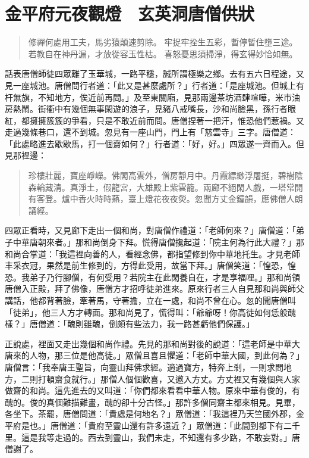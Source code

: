
\chapter{金平府元夜觀燈　玄英洞唐僧供狀}

\begin{quote}
修禪何處用工夫，馬劣猿顛速剪除。
牢捉牢拴生五彩，暫停暫住墮三途。
若教自在神丹漏，才放從容玉性枯。
喜怒憂思須掃淨，得玄得妙恰如無。
\end{quote}

話表唐僧師徒四眾離了玉華城，一路平穩，誠所謂極樂之鄉。去有五六日程途，又見一座城池。唐僧問行者道：「此又是甚麼處所？」行者道：「是座城池。但城上有杆無旗，不知地方，俟近前再問。」及至東關廂，見那兩邊茶坊酒肆喧嘩，米市油房熱鬧。街衢中有幾個無事閑遊的浪子，見豬八戒嘴長，沙和尚臉黑，孫行者眼紅，都擁擁簇簇的爭看，只是不敢近前而問。唐僧捏著一把汗，惟恐他們惹禍。又走過幾條巷口，還不到城。忽見有一座山門，門上有「慈雲寺」三字。唐僧道：「此處略進去歇歇馬，打一個齋如何？」行者道：「好，好。」四眾遂一齊而入。但見那裡邊：
\begin{quote}
珍樓壯麗，寶座崢嶸。佛閣高雲外，僧房靜月中。丹霞縹緲浮屠挺，碧樹陰森輪藏清。真淨土，假龍宮，大雄殿上紫雲籠。兩廊不絕閑人戲，一塔常開有客登。爐中香火時時爇，臺上燈花夜夜熒。忽聞方丈金鐘韻，應佛僧人朗誦經。
\end{quote}

四眾正看時，又見廊下走出一個和尚，對唐僧作禮道：「老師何來？」唐僧道：「弟子中華唐朝來者。」那和尚倒身下拜。慌得唐僧攙起道：「院主何為行此大禮？」那和尚合掌道：「我這裡向善的人，看經念佛，都指望修到你中華地托生。才見老師丰采衣冠，果然是前生修到的，方得此受用，故當下拜。」唐僧笑道：「惶恐，惶恐。我弟子乃行腳僧，有何受用？若院主在此閑養自在，才是享福哩。」那和尚領唐僧入正殿，拜了佛像，唐僧方才招呼徒弟進來。原來行者三人自見那和尚與師父講話，他都背著臉，牽著馬，守著擔，立在一處，和尚不曾在心。忽的聞唐僧叫「徒弟」，他三人方才轉面。那和尚見了，慌得叫：「爺爺呀！你高徒如何恁般醜樣？」唐僧道：「醜則雖醜，倒頗有些法力，我一路甚虧他們保護。」

正說處，裡面又走出幾個和尚作禮。先見的那和尚對後的說道：「這老師是中華大唐來的人物，那三位是他高徒。」眾僧且喜且懼道：「老師中華大國，到此何為？」唐僧言：「我奉唐王聖旨，向靈山拜佛求經。適過寶方，特奔上剎，一則求問地方，二則打頓齋食就行。」那僧人個個歡喜，又邀入方丈。方丈裡又有幾個與人家做齋的和尚。這先進去的又叫道：「你們都來看看中華人物。原來中華有俊的，有醜的。俊的真個難描難畫，醜的卻十分古怪。」那許多僧同齋主都來相見。見畢，各坐下。茶罷，唐僧問道：「貴處是何地名？」眾僧道：「我這裡乃天竺國外郡，金平府是也。」唐僧道：「貴府至靈山還有許多遠近？」眾僧道：「此間到都下有二千里。這是我等走過的。西去到靈山，我們未走，不知還有多少路，不敢妄對。」唐僧謝了。

